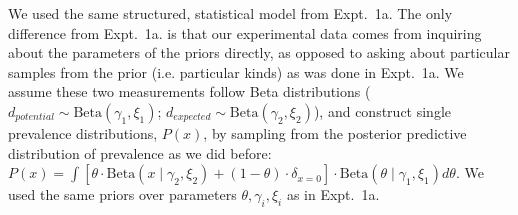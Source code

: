 \documentclass[12pt,letterpaper]{article}
\newcommand{\ndg}[1]{\textcolor{Green}{[ndg: #1]}}
\begin{document}
We used the same structured, statistical model from Expt.~1a.
The only difference from Expt.~1a. is that our experimental data comes from inquiring about the parameters of the priors directly, as opposed to asking about particular samples from the prior (i.e. particular kinds) as was done in Expt.~1a. 
We assume these two measurements follow Beta distributions ($d_{potential} \sim \text{Beta}(\gamma_{1}, \xi_{1})$; $
d_{expected} \sim \text{Beta}(\gamma_{2}, \xi_{2})$), and construct single prevalence distributions, $P(x)$, by sampling from the posterior predictive distribution of prevalence as we did before: $P(x) = \int [ \theta\cdot \text{Beta} (x \mid \gamma_{2}, \xi_{2}) + (1 -  \theta) \cdot \delta_{x=0} ] \cdot \text{Beta}(\theta \mid \gamma_{1}, \xi_{1}) d\theta$.
We used the same priors over parameters $\theta, \gamma_{i}, \xi_{i}$ as in Expt.~1a.
%
%
\end{document}
